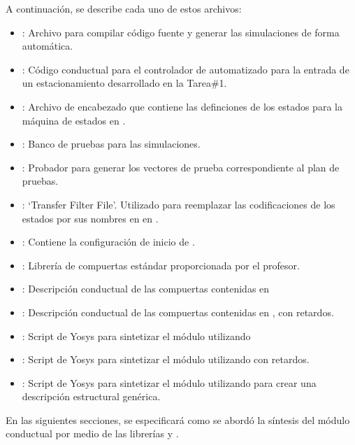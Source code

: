 A continuación, se describe cada uno de estos archivos:
\begin{itemize}
    \item {}: Archivo para compilar código fuente y generar las simulaciones de forma automática.
    \item {}: Código conductual para el controlador de automatizado para la entrada de un estacionamiento desarrollado en la Tarea\#1. 
    \item {}: Archivo de encabezado que contiene las definciones de los estados para la máquina de estados en .
    \item {}: Banco de pruebas para las simulaciones.
    \item {}: Probador para generar los vectores de prueba correspondiente al plan de pruebas.
    \item {}: `Transfer Filter File'. Utilizado para reemplazar las codificaciones de los estados por sus nombres en  en .
    \item {}: Contiene la configuración de inicio de . 
    \item {}: Librería de compuertas estándar proporcionada por el profesor.
    \item {}: Descripción conductual de las compuertas contenidas en 
    \item {}: Descripción conductual de las compuertas contenidas en , con retardos.
    \item {}: Script de Yosys para sintetizar el módulo  utilizando  
    \item {}: Script de Yosys para sintetizar el módulo  utilizando  con retardos. 
    \item {}: Script de Yosys para sintetizar el módulo  utilizando  para crear una descripción estructural genérica. 
\end{itemize}
En las siguientes secciones, se especificará como se abordó la síntesis del módulo conductual por medio de las librerías  y .

